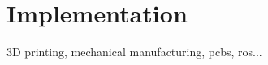 \chapter{Implementation} %
\label{cha:implementation}

3D printing, mechanical manufacturing, pcbs, ros...

